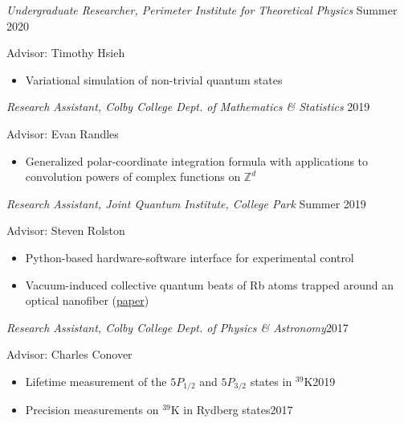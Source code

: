 \documentclass[10pt]{article}
\begin{document}
\noindent \textit{Undergraduate Researcher, Perimeter Institute for Theoretical Physics} \hfill Summer 2020

\vspace{2pt}
Advisor: Timothy Hsieh 
\vspace{-5pt}
\begin{itemize}
	\setlength\itemsep{-4pt}
	\item Variational simulation of non-trivial quantum states 
\end{itemize}


\noindent \textit{Research Assistant, Colby College Dept. of Mathematics \& Statistics} \hfill 2019

\vspace{2pt}
Advisor: Evan Randles 
\vspace{-5pt}
\begin{itemize}
	\setlength\itemsep{-4pt}
	\item Generalized polar-coordinate integration formula with applications to convolution powers of complex functions on $\mathbb{Z}^d$
\end{itemize}


\noindent \textit{Research Assistant, Joint Quantum Institute, College Park} \hfill Summer 2019

\vspace{2pt}
Advisor:  Steven Rolston
\vspace{-5pt}
\begin{itemize}
	\setlength\itemsep{-4pt}
	\item Python-based hardware-software interface for experimental control
	\item Vacuum-induced collective quantum beats of Rb atoms trapped around an optical nanofiber
	(\href{https://arxiv.org/abs/2102.11982}{paper})
\end{itemize}

\noindent \textit{Research Assistant, Colby College Dept. of Physics \& Astronomy}\hfill 2017

\vspace{2pt}
Advisor: Charles Conover 
\vspace{-5pt}
\begin{itemize}
	\setlength\itemsep{-4pt}
	\item Lifetime measurement of the $5P_{1/2}$ and $5P_{3/2}$ states in $^{\text{39}}$K\hfill 2019
	\item Precision measurements on $^{\text{39}}$K in Rydberg states\hfill 2017 
\end{itemize}
\end{document}
